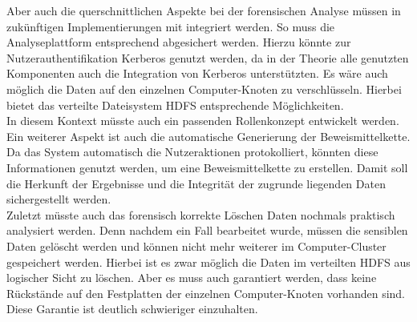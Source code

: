 \noindent
Aber auch die querschnittlichen Aspekte bei der forensischen Analyse müssen in zukünftigen Implementierungen mit integriert werden. So muss die Analyseplattform entsprechend abgesichert werden. Hierzu könnte zur Nutzerauthentifikation Kerberos genutzt werden, da in der Theorie alle genutzten Komponenten auch die Integration von Kerberos unterstützten. Es wäre auch möglich die Daten auf den einzelnen Computer-Knoten zu verschlüsseln. Hierbei bietet das verteilte Dateisystem HDFS entsprechende Möglichkeiten.\\ In diesem Kontext müsste auch ein passenden Rollenkonzept entwickelt werden.\\ Ein weiterer Aspekt ist auch die automatische Generierung der Beweismittelkette. Da das System automatisch die Nutzeraktionen protokolliert, könnten diese Informationen genutzt werden, um eine Beweismittelkette zu erstellen. Damit soll die Herkunft der Ergebnisse und die Integrität der zugrunde liegenden Daten sichergestellt werden.\\
Zuletzt müsste auch das forensisch korrekte Löschen Daten nochmals praktisch analysiert werden. Denn nachdem ein Fall bearbeitet wurde, müssen die sensiblen Daten gelöscht werden und können nicht mehr weiterer im Computer-Cluster gespeichert werden. Hierbei ist es zwar möglich die Daten im verteilten HDFS aus logischer Sicht zu löschen. Aber es muss auch garantiert werden, dass keine Rückstände auf den Festplatten der einzelnen  Computer-Knoten vorhanden sind. Diese Garantie ist deutlich schwieriger einzuhalten.